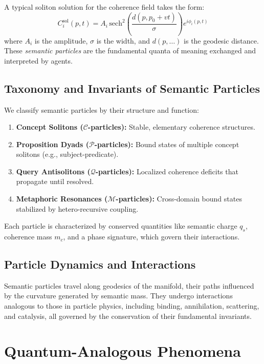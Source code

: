 A typical soliton solution for the coherence field takes the form:
\begin{equation}
C_i^{\mathrm{sol}}(p, t) = A_i\, \mathrm{sech}^2\left(\frac{d(p, p_0 + vt)}{\sigma}\right) e^{i\phi_i(p, t)}
\end{equation}
where \(A_i\) is the amplitude, \(\sigma\) is the width, and \(d(p, \dots)\) is the geodesic distance. These \textit{semantic particles} are the fundamental quanta of meaning exchanged and interpreted by agents.

\subsection{Taxonomy and Invariants of Semantic Particles}

We classify semantic particles by their structure and function:
\begin{enumerate}
    \item \textbf{Concept Solitons (\(\mathcal{C}\)-particles):} Stable, elementary coherence structures.
    \item \textbf{Proposition Dyads (\(\mathcal{P}\)-particles):} Bound states of multiple concept solitons (e.g., subject-predicate).
    \item \textbf{Query Antisolitons (\(\mathcal{Q}\)-particles):} Localized coherence deficits that propagate until resolved.
    \item \textbf{Metaphoric Resonances (\(\mathcal{M}\)-particles):} Cross-domain bound states stabilized by hetero-recursive coupling.
\end{enumerate}
Each particle is characterized by conserved quantities like semantic charge \(q_s\), coherence mass \(m_c\), and a phase signature, which govern their interactions.

\subsection{Particle Dynamics and Interactions}
Semantic particles travel along geodesics of the manifold, their paths influenced by the curvature generated by semantic mass. They undergo interactions analogous to those in particle physics, including binding, annihilation, scattering, and catalysis, all governed by the conservation of their fundamental invariants.

\section{Quantum-Analogous Phenomena}

